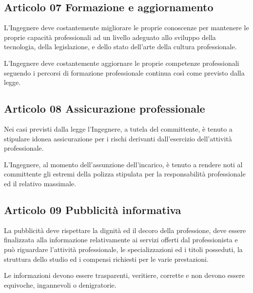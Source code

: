 \documentclass[letterpaper,10pt,italian]{sphinxmanual}
\begin{document}
\subsection{Articolo 07 \sphinxhyphen{} Formazione e aggiornamento}
\label{\detokenize{capitoli/codice/codice_deontologico:articolo-07-formazione-e-aggiornamento}}\begin{description}
\sphinxAtStartPar
L’Ingegnere deve costantemente migliorare le proprie conoscenze per mantenere le proprie capacità professionali ad un livello adeguato allo sviluppo della tecnologia, della legislazione, e dello stato dell’arte della cultura professionale.

\sphinxAtStartPar
L’Ingegnere deve costantemente aggiornare le proprie competenze professionali seguendo i percorsi di formazione professionale continua così come previsto dalla legge.

\end{description}


\subsection{Articolo 08 \sphinxhyphen{} Assicurazione professionale}
\label{\detokenize{capitoli/codice/codice_deontologico:articolo-08-assicurazione-professionale}}\begin{description}
\sphinxAtStartPar
Nei casi previsti dalla legge l’Ingegnere, a tutela del committente, è tenuto a stipulare idonea assicurazione per i rischi derivanti dall’esercizio dell’attività professionale.

\sphinxAtStartPar
L’Ingegnere, al momento dell’assunzione dell’incarico, è tenuto a rendere noti al committente gli estremi della polizza stipulata per la responsabilità professionale ed il relativo massimale.

\end{description}


\subsection{Articolo 09 \sphinxhyphen{} Pubblicità informativa}
\label{\detokenize{capitoli/codice/codice_deontologico:articolo-09-pubblicita-informativa}}\begin{description}
\sphinxAtStartPar
La pubblicità deve rispettare la dignità ed il decoro della professione, deve essere finalizzata alla informazione relativamente ai servizi offerti dal professionista e può riguardare l’attività professionale, le specializzazioni ed i titoli posseduti, la struttura dello studio ed i compensi richiesti per le varie prestazioni.

\sphinxAtStartPar
Le informazioni devono essere trasparenti, veritiere, corrette e non devono essere equivoche, ingannevoli o denigratorie.

\end{description}
\end{document}
